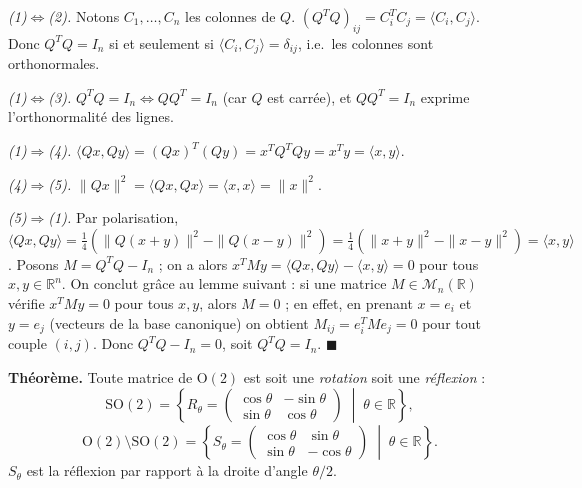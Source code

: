 \begin{mdframed}[style=proofbar]
  \textit{(1)$\Leftrightarrow$(2).} Notons $C_1,\ldots,C_n$ les colonnes de $Q$.
  $(Q^TQ)_{ij} = C_i^T C_j = \langle C_i, C_j\rangle$. Donc $Q^TQ = I_n$
  si et seulement si $\langle C_i,C_j\rangle = \delta_{ij}$, i.e.\ les colonnes
  sont orthonormales.

  \textit{(1)$\Leftrightarrow$(3).} $Q^TQ=I_n \Leftrightarrow QQ^T=I_n$
  (car $Q$ est carrée), et $QQ^T=I_n$ exprime l'orthonormalité des lignes.

  \textit{(1)$\Rightarrow$(4).}
  $\langle Qx,Qy\rangle = {(Qx)}^T(Qy) = x^TQ^TQy = x^Ty = \langle x,y\rangle$.

  \textit{(4)$\Rightarrow$(5).} $\|Qx\|^2 = \langle Qx,Qx\rangle = \langle x,x\rangle = \|x\|^2$.

  \textit{(5)$\Rightarrow$(1).} Par polarisation,
  $\langle Qx,Qy\rangle = \frac{1}{4}(\|Q(x+y)\|^2 - \|Q(x-y)\|^2)
  = \frac{1}{4}(\|x+y\|^2-\|x-y\|^2) = \langle x,y\rangle$.
  Posons $M = Q^TQ - I_n$ ; on a alors $x^T M y = \langle Qx,Qy\rangle - \langle x,y\rangle = 0$
  pour tous $x,y\in\mathbb{R}^n$. On conclut grâce au lemme suivant : si une matrice
  $M\in\mathcal{M}_n(\mathbb{R})$ vérifie $x^TMy=0$ pour tous $x,y$, alors $M=0$ ;
  en effet, en prenant $x=e_i$ et $y=e_j$ (vecteurs de la base canonique) on obtient
  $M_{ij}=e_i^TMe_j=0$ pour tout couple $(i,j)$. Donc $Q^TQ-I_n=0$, soit $Q^TQ=I_n$.
  $\blacksquare$
\end{mdframed}

\decsep{}



\begin{tcolorbox}[thmbox]
  \textbf{Théorème.}\enspace%
  Toute matrice de $\mathrm{O}(2)$ est soit une \emph{rotation} soit
  une \emph{réflexion} :
  \[
    \mathrm{SO}(2) = \left\{R_\theta = \begin{pmatrix}\cos\theta&-\sin\theta\\\sin\theta&\cos\theta\end{pmatrix} \;\middle|\; \theta\in\mathbb{R}\right\},
  \]
  \[
    \mathrm{O}(2)\setminus\mathrm{SO}(2) = \left\{S_\theta = \begin{pmatrix}\cos\theta&\sin\theta\\\sin\theta&-\cos\theta\end{pmatrix} \;\middle|\; \theta\in\mathbb{R}\right\}.
  \]
  $S_\theta$ est la réflexion par rapport à la droite d'angle $\theta/2$.
\end{tcolorbox}

